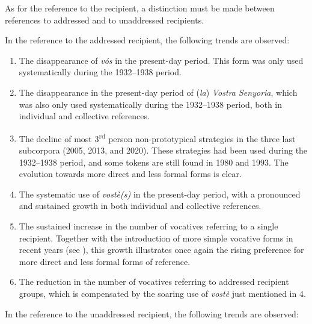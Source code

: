 \documentclass[output=paper]{langscibook}
\begin{document}
As for the reference to the recipient, a distinction must be made between references to addressed and to unaddressed recipients.



In the reference to the addressed recipient, the following trends are observed:

\begin{enumerate}

\item The disappearance of \textit{vós} in the present-day period. This form was only used systematically during the 1932–1938 period.

\item The disappearance in the present-day period of (\textit{la}) \textit{Vostra Senyoria}, which was also only used systematically during the 1932–1938 period, both in individual and collective references.

\item The decline of most 3\textsuperscript{rd} person non-prototypical strategies in the three last subcorpora (2005, 2013, and 2020). These strategies had been used during the 1932–1938 period, and some tokens are still found in 1980 and 1993. The evolution towards more direct and less formal forms is clear.

\item The systematic use of \textit{vostè(s)} in the present-day period, with a pronounced and sustained growth in both individual and collective references.

\item The sustained increase in the number of vocatives referring to a single recipient. Together with the introduction of more simple vocative forms in recent years (see ), this growth illustrates once again the rising preference for more direct and less formal forms of reference.

\item The reduction in the number of vocatives referring to addressed recipient groups, which is compensated by the soaring use of \textit{vostè} just mentioned in 4.

\end{enumerate}

In the reference to the unaddressed recipient, the following trends are observed:
\end{document}

